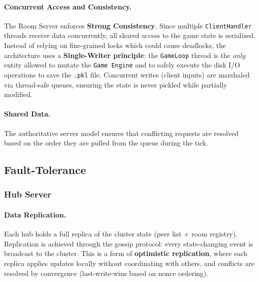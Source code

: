 \paragraph{Concurrent Access and Consistency.}
The Room Server enforces \textbf{Strong Consistency}. 
Since multiple \texttt{ClientHandler} threads receive data concurrently, all shared access to the game state is serialized. 
Instead of relying on fine-grained locks which could cause deadlocks, the architecture uses a \textbf{Single-Writer principle}: the \texttt{GameLoop} thread is the \textit{only} entity allowed to mutate the \texttt{Game Engine} and to safely execute the disk I/O operations to save the \texttt{.pkl} file. 
Concurrent writes (client inputs) are marshaled via thread-safe queues, ensuring the state is never pickled while partially modified.

\paragraph{Shared Data.}
The authoritative server model ensures that conflicting requests are resolved based on the order they are pulled from the queue during the tick.

\subsection{Fault-Tolerance}\label{fault-tolerance}

\subsubsection{Hub Server}

\paragraph{Data Replication.}
Each hub holds a full replica of the cluster state (peer list + room registry).
Replication is achieved through the gossip protocol: every state-changing event is broadcast to the cluster.
This is a form of \textbf{optimistic replication}, where each replica applies updates locally without coordinating with others, and conflicts are resolved by convergence (last-write-wins based on nonce ordering).

